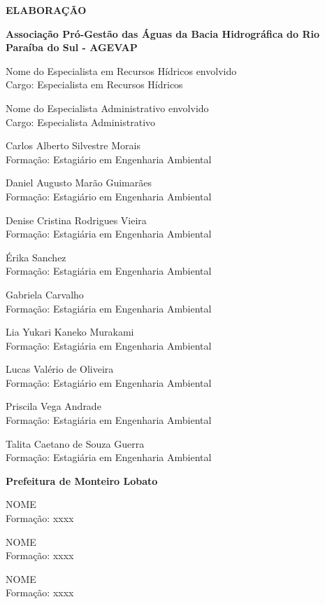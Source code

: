 
	\begin{flushleft}
	{\bfseries\Large\MakeUppercase{Elaboração}}\vspace{1.5em}
	
	\textbf{Associação Pró-Gestão das Águas da Bacia Hidrográfica do Rio Paraíba do Sul - AGEVAP}\vspace{1em}

	{Nome do Especialista em Recursos Hídricos envolvido\\
	Cargo: Especialista em Recursos Hídricos}\vspace{1em}

	{Nome do Especialista Administrativo envolvido\\
	Cargo: Especialista Administrativo}\vspace{1em}

	{Carlos Alberto Silvestre Morais\\
	Formação: Estagiário em Engenharia Ambiental}\vspace{1em}
	
	{Daniel Augusto Marão Guimarães\\
	Formação: Estagiário em Engenharia Ambiental}\vspace{1em}
	
	{Denise Cristina Rodrigues Vieira\\
	Formação: Estagiária em Engenharia Ambiental}\vspace{1em}
	
	{Érika Sanchez\\
	Formação: Estagiária em Engenharia Ambiental}\vspace{1em}
	
	{Gabriela Carvalho\\
	Formação: Estagiária em Engenharia Ambiental}\vspace{1em}
	
	{Lia Yukari Kaneko Murakami\\
	Formação: Estagiária em Engenharia Ambiental}\vspace{1em}
	
	{Lucas Valério de Oliveira\\
	Formação: Estagiário em Engenharia Ambiental}\vspace{1em}
	
	{Priscila Vega Andrade\\
	Formação: Estagiária em Engenharia Ambiental}\vspace{1em}
	
	{Talita Caetano de Souza Guerra\\
	Formação: Estagiária em Engenharia Ambiental}\vspace{1em}

	\textbf{Prefeitura de Monteiro Lobato}\vspace{1em}
	
	{NOME\\
		Formação: xxxx}\vspace{1em}
	
	{NOME\\
	Formação: xxxx}\vspace{1em}

	{NOME\\
	Formação: xxxx}\vspace{1em}
\end{flushleft}
